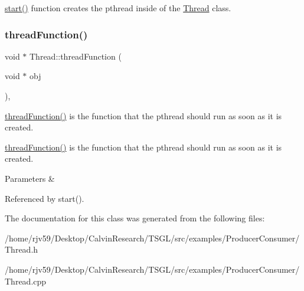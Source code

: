 \hyperlink{class_thread_a1f53ee62bd30a7924186ef26150ce262}{start()} function creates the pthread inside of the \hyperlink{class_thread}{Thread} class. \mbox{\label{class_thread_ae54fcbb9f00b8356b23795ac477f9577}} 
\subsubsection{\texorpdfstring{thread\+Function()}{threadFunction()}}
{\footnotesize\ttfamily void $\ast$ Thread\+::thread\+Function (\begin{DoxyParamCaption}\item[{void $\ast$}]{obj }\end{DoxyParamCaption})\hspace{0.3cm}{\ttfamily [static]}, {\ttfamily [protected]}}



\hyperlink{class_thread_ae54fcbb9f00b8356b23795ac477f9577}{thread\+Function()} is the function that the pthread should run as soon as it is created. 

\hyperlink{class_thread_ae54fcbb9f00b8356b23795ac477f9577}{thread\+Function()} is the function that the pthread should run as soon as it is created. 
\begin{DoxyParams}{Parameters}
{\em } & \\
\hline
\end{DoxyParams}


Referenced by start().



The documentation for this class was generated from the following files\+:\begin{DoxyCompactItemize}
\item 
/home/rjv59/\+Desktop/\+Calvin\+Research/\+T\+S\+G\+L/src/examples/\+Producer\+Consumer/Thread.\+h\item 
/home/rjv59/\+Desktop/\+Calvin\+Research/\+T\+S\+G\+L/src/examples/\+Producer\+Consumer/Thread.\+cpp\end{DoxyCompactItemize}
